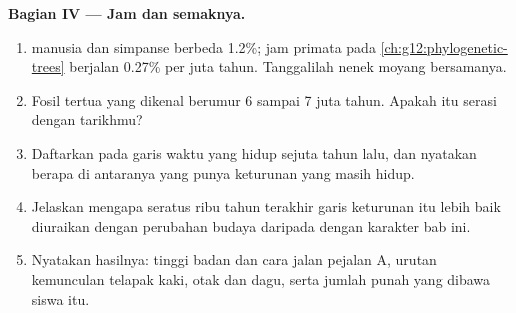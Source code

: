 \begin{problem}
\medskip
\noindent\textbf{Bagian IV --- Jam dan semaknya.}
\begin{enumerate}[resume]
  \item {} manusia dan simpanse berbeda 1.2\%; jam primata pada
        \cref{ch:g12:phylogenetic-trees} berjalan 0.27\% per juta
        tahun. Tanggalilah nenek moyang bersamanya.
  \item Fosil tertua  yang dikenal berumur 6
        sampai 7 juta tahun. Apakah itu serasi dengan tarikhmu?
  \item Daftarkan  pada garis waktu yang hidup sejuta tahun
        lalu, dan nyatakan berapa di antaranya yang punya keturunan
        yang masih hidup.
  \item Jelaskan mengapa seratus ribu tahun terakhir garis keturunan
        itu lebih baik diuraikan dengan perubahan budaya daripada
        dengan karakter bab ini.
  \item Nyatakan hasilnya: tinggi badan dan cara jalan pejalan A,
        urutan kemunculan telapak kaki, otak dan dagu, serta jumlah
         punah yang  dibawa siswa itu.
\end{enumerate}
\end{problem}
